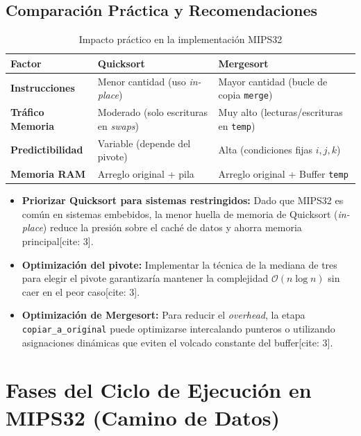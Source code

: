 \documentclass[12pt,a4paper]{article}
\begin{document}
\subsection{Comparación Práctica y Recomendaciones}
\begin{table}[h!]
\centering
\caption{Impacto práctico en la implementación MIPS32}
\vspace{0.2cm}
\begin{tabular}{lll}
\toprule
\textbf{Factor} & \textbf{Quicksort} & \textbf{Mergesort} \\
\midrule
\textbf{Instrucciones} & Menor cantidad (uso \textit{in-place}) & Mayor cantidad (bucle de copia \texttt{merge}) \\
\textbf{Tráfico Memoria} & Moderado (solo escrituras en \textit{swaps}) & Muy alto (lecturas/escrituras en \texttt{temp}) \\
\textbf{Predictibilidad} & Variable (depende del pivote) & Alta (condiciones fijas $i, j, k$) \\
\textbf{Memoria RAM} & Arreglo original + pila & Arreglo original + Buffer \texttt{temp} \\
\bottomrule
\end{tabular}
\end{table}

\begin{itemize}
    \item \textbf{Priorizar Quicksort para sistemas restringidos:} Dado que MIPS32 es común en sistemas embebidos, la menor huella de memoria de Quicksort (\textit{in-place}) reduce la presión sobre el caché de datos y ahorra memoria principal[cite: 3].
    \item \textbf{Optimización del pivote:} Implementar la técnica de la mediana de tres para elegir el pivote garantizaría mantener la complejidad $\mathcal{O}(n \log n)$ sin caer en el peor caso[cite: 3].
    \item \textbf{Optimización de Mergesort:} Para reducir el \textit{overhead}, la etapa \texttt{copiar\_a\_original} puede optimizarse intercalando punteros o utilizando asignaciones dinámicas que eviten el volcado constante del buffer[cite: 3].
\end{itemize}


\section{Fases del Ciclo de Ejecución en MIPS32 (Camino de Datos)}
\end{document}
